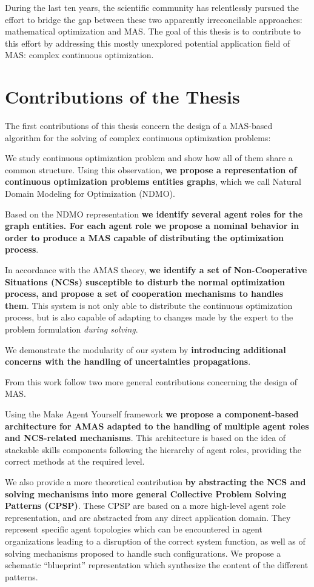 \pagebreak
During the last ten years, the scientific community has relentlessly pursued the effort to bridge the gap between these two apparently irreconcilable approaches: mathematical optimization and MAS. The goal of this thesis is to contribute to this effort by addressing this mostly unexplored potential application field of MAS: complex continuous optimization.

\section*{Contributions of the Thesis}

The first contributions of this thesis concern the design of a MAS-based algorithm for the solving of complex continuous optimization problems:

We study continuous optimization problem and show how all of them share a common structure. Using this observation, \textbf{we propose a representation of continuous optimization problems entities graphs}, which we call Natural Domain Modeling for Optimization (NDMO).

Based on the NDMO representation \textbf{we identify several agent roles for the graph entities. For each agent role we propose a nominal behavior in order to produce a MAS capable of distributing the optimization process}.

In accordance with the AMAS theory, \textbf{we identify a set of Non-Cooperative Situations (NCSs) susceptible to disturb the normal optimization process, and propose a set of cooperation mechanisms to handles them}. This system is not only able to distribute the continuous optimization process, but is also capable of adapting to changes made by the expert to the problem formulation \emph{during solving}.

We demonstrate the modularity of our system by \textbf{introducing additional concerns with the handling of uncertainties propagations}.

From this work follow two more general contributions concerning the design of MAS.

Using the Make Agent Yourself framework \textbf{we propose a component-based architecture for AMAS adapted to the handling of multiple agent roles and NCS-related mechanisms}. This architecture is based on the idea of stackable skills components following the hierarchy of agent roles, providing the correct methods at the required level.

We also provide a more theoretical contribution \textbf{by abstracting the NCS and solving mechanisms into more general Collective Problem Solving Patterns (CPSP)}. These CPSP are based on a more high-level agent role representation, and are abstracted from any direct application domain. They represent specific agent topologies which can be encountered in agent organizations leading to a disruption of the correct system function, as well as of solving mechanisms proposed to handle such configurations. We propose a schematic \enquote{blueprint} representation which synthesize the content of the different patterns.

